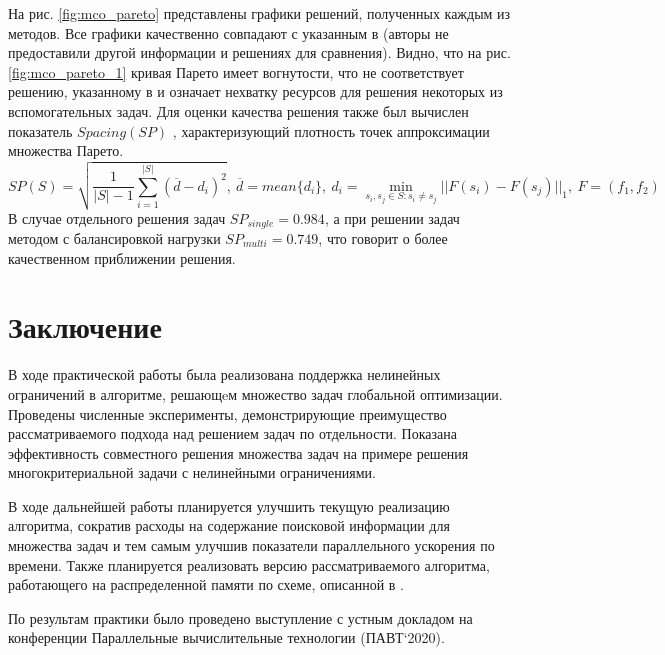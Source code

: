 На рис. \ref{fig:mco_pareto} представлены графики решений, полученных каждым из методов.
Все графики качественно совпадают с указанным в \cite{BinhKorn1999} (авторы не предоставили другой
информации и решениях для сравнения). Видно, что на рис. \ref{fig:mco_pareto_1}
кривая Парето имеет вогнутости, что не соответствует решению, указанному в \cite{BinhKorn1999} и
означает нехватку ресурсов для решения некоторых из вспомогательных задач.
Для оценки качества решения также был вычислен показатель \(Spacing(SP)\) \cite{RiquelmeLucken2015},
характеризующий плотность точек аппроксимации множества Парето.
\begin{displaymath}
  SP(S)=\sqrt{\frac{1}{|S|-1} \sum_{i=1}^{|S|} (\overline{d}-d_i)^2},
  \:\overline{d}=mean\{d_i\},\:d_i=\min_{s_i,s_j\in S:s_i\ne s_j}||F(s_i)-F(s_j)||_1,\: F=(f_1,f_2)
\end{displaymath}
В случае отдельного решения задач \(SP_{single}=0.984\), а при решении задач методом с балансировкой нагрузки
\(SP_{multi}=0.749\), что говорит о более качественном приближении решения.

\section{Заключение}

В ходе практической работы была реализована поддержка нелинейных ограничений в алгоритме, решающeм
множество задач глобальной оптимизации. Проведены численные эксперименты, демонстрирующие
преимущество рассматриваемого подхода над решением задач по отдельности. Показана эффективность
совместного решения множества задач на примере решения многокритериальной задачи с
нелинейными ограничениями.

В ходе дальнейшей работы планируется улучшить текущую реализацию алгоритма,
сократив расходы на содержание поисковой информации для множества задач и тем самым улучшив
показатели параллельного ускорения по времени. Также планируется реализовать версию
рассматриваемого алгоритма, работающего на распределенной памяти по схеме, описанной в \cite{BarkalovLebedev2017_2}.

По результам практики было проведено выступление с устным докладом на конференции Параллельные вычислительные технологии (ПАВТ`2020).
